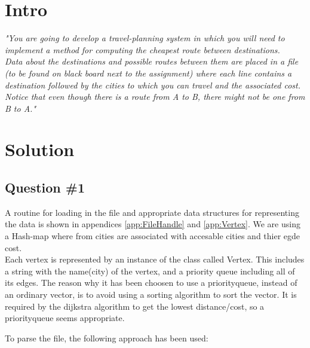 \section{Intro}
\label{sec:intro}
\textit{"You are going to develop a travel-planning system in which you will need to implement a method for computing the cheapest route between destinations. \\
Data about the destinations and possible routes between them are placed in a file (to be found on black board next to the assignment) where each line contains a destination followed by the cities to which you can travel and the associated cost. \\
Notice that even though there is a route from A to B, there might not be one from B to A."}


\section{Solution}
\subsection{Question \#1}
A routine for loading in the file and appropriate data structures for representing the data is shown in appendices \ref{app:FileHandle} and \ref{app:Vertex}. We are using a Hash-map where from cities are associated with accesable cities and thier egde cost.\\
Each vertex is represented by an instance of the class called Vertex. This includes a string with the name(city) of the vertex, and a priority queue  including all of its edges.  The reason why it has been choosen to use a priorityqueue, instead of an ordinary vector, is to avoid using a sorting algorithm to sort the vector. It is required by the dijkstra algorithm to get the lowest distance/cost, so a priorityqueue seems appropriate.

To parse the file, the following approach has been used:

